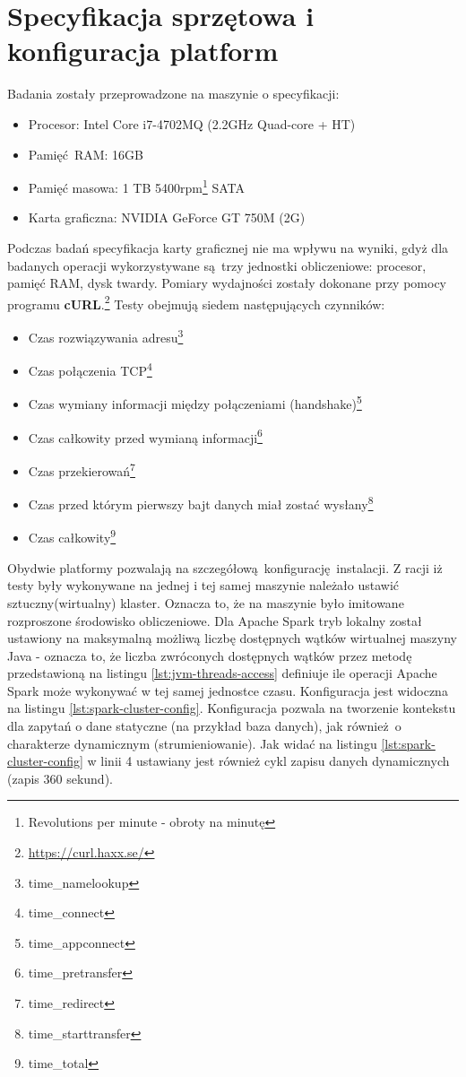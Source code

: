 \section{Specyfikacja sprzętowa i konfiguracja platform}
Badania zostały przeprowadzone na maszynie o specyfikacji:
\begin{itemize}
	\item Procesor: Intel Core i7-4702MQ (2.2GHz Quad-core + HT) 
	\item Pamięć RAM: 16GB
	\item Pamięć masowa: 1 TB 5400rpm\footnote{Revolutions per minute - obroty na minutę} SATA
	\item Karta graficzna: NVIDIA GeForce GT 750M (2G)  
\end{itemize}
Podczas badań specyfikacja karty graficznej nie ma wpływu na wyniki, gdyż dla badanych operacji wykorzystywane są trzy jednostki obliczeniowe: procesor, pamięć RAM, dysk twardy.
\newline Pomiary wydajności zostały dokonane przy pomocy programu \textbf{cURL}.\footnote{\url{https://curl.haxx.se/}} Testy obejmują siedem następujących czynników:
\begin{itemize}\label{items:time-descriptions}
	\item{Czas rozwiązywania adresu\footnote{time\_namelookup}}
	\item{Czas połączenia TCP\footnote{time\_connect}}
	\item{Czas wymiany informacji między połączeniami (handshake)\footnote{time\_appconnect}} 
	\item{Czas całkowity przed wymianą informacji\footnote{time\_pretransfer}}
	\item{Czas przekierowań\footnote{time\_redirect}}
	\item{Czas przed którym pierwszy bajt danych miał zostać wysłany\footnote{time\_starttransfer}}
	\item{Czas całkowity\footnote{time\_total}}
\end{itemize}
Obydwie platformy pozwalają na szczegółową konfigurację instalacji. Z racji iż testy były wykonywane na jednej i tej samej maszynie należało ustawić sztuczny(wirtualny) klaster. Oznacza to, że na maszynie było imitowane rozproszone środowisko obliczeniowe. Dla Apache Spark tryb lokalny został ustawiony na maksymalną możliwą liczbę dostępnych wątków wirtualnej maszyny Java - oznacza to, że liczba zwróconych dostępnych wątków przez metodę przedstawioną na listingu \ref{lst:jvm-threads-access} definiuje ile operacji Apache Spark może wykonywać w tej samej jednostce czasu. Konfiguracja jest widoczna na listingu \ref{lst:spark-cluster-config}. Konfiguracja pozwala na tworzenie kontekstu dla zapytań o dane statyczne (na przykład baza danych), jak również o charakterze dynamicznym (strumieniowanie). Jak widać na listingu \ref{lst:spark-cluster-config} w linii 4 ustawiany jest również cykl zapisu danych dynamicznych (zapis 360 sekund).
